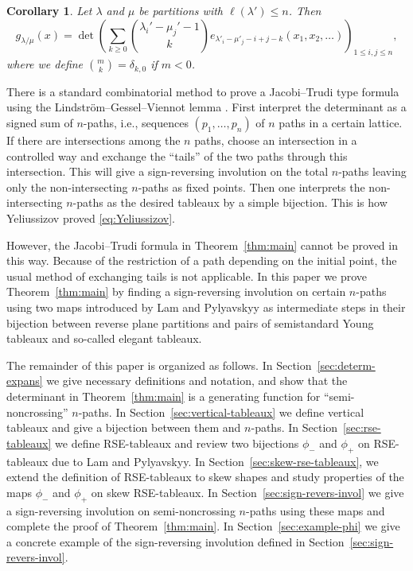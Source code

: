 \documentclass{amsart}
\numberwithin{equation}{section}
\newtheorem{cor}[thm]{Corollary}
\theoremstyle{definition}
\newcommand\pd{\phi_+}
\newcommand\pu{\phi_-}
\begin{document}
\begin{cor}\label{cor:main}
  Let $\lambda$ and $\mu$ be partitions with $\ell(\lambda')\le n$. Then
\[
  g_{\lambda/\mu}(x) = \det
  \left(\sum_{k\ge0} \binom{\lambda_i'-\mu_j'-1}{k} e_{\lambda'_i-\mu'_j-i+j-k}
    (x_1,x_2,\dots) \right)_{1\le i,j\le n},
\]
where we define $\binom{m}{k}=\delta_{k,0}$ if $m<0$.
\end{cor}



There is a standard combinatorial method to prove a Jacobi--Trudi type formula
using the Lindstr\"om--Gessel--Viennot lemma \cite{LGV,Lindstrom}.
First interpret the determinant as a signed sum of $n$-paths, i.e., sequences
$(p_1,\dots,p_n)$ of $n$ paths in a certain lattice. If there are intersections
among the $n$ paths, choose an intersection in a controlled way and exchange the
``tails'' of the two paths through this intersection. This will give a
sign-reversing involution on the total $n$-paths leaving only the
non-intersecting $n$-paths as fixed points. Then one interprets the
non-intersecting $n$-paths as the desired tableaux by a simple bijection.
This is how Yeliussizov \cite{Yeliussizov2017} proved \eqref{eq:Yeliussizov}.

However, the Jacobi--Trudi formula in Theorem~\ref{thm:main} cannot be proved in
this way. Because of the restriction of a path depending on the initial point,
the usual method of exchanging tails is not applicable. In this paper we prove
Theorem~\ref{thm:main} by finding a sign-reversing involution on certain
$n$-paths using two maps introduced by Lam and Pylyavskyy \cite{LP2007} as
intermediate steps in their bijection between reverse plane partitions and pairs
of semistandard Young tableaux and so-called elegant tableaux.

The remainder of this paper is organized as follows. In
Section~\ref{sec:determ-expans} we give necessary definitions and notation, and
show that the determinant in Theorem~\ref{thm:main} is a generating function for
``semi-noncrossing'' $n$-paths. In Section~\ref{sec:vertical-tableaux} we define
vertical tableaux and give a bijection between them and $n$-paths. In
Section~\ref{sec:rse-tableaux} we define RSE-tableaux and review two bijections
$\pu$ and $\pd$ on RSE-tableaux due to Lam and Pylyavskyy. In
Section~\ref{sec:skew-rse-tableaux}, we extend the definition of RSE-tableaux to
skew shapes and study properties of the maps $\pu$ and $\pd$ on skew
RSE-tableaux. In Section~\ref{sec:sign-revers-invol} we give a sign-reversing
involution on semi-noncrossing $n$-paths using these maps and complete the proof
of Theorem~\ref{thm:main}. In Section~\ref{sec:example-phi} we give a concrete
example of the sign-reversing involution defined in
Section~\ref{sec:sign-revers-invol}.
\end{document}

